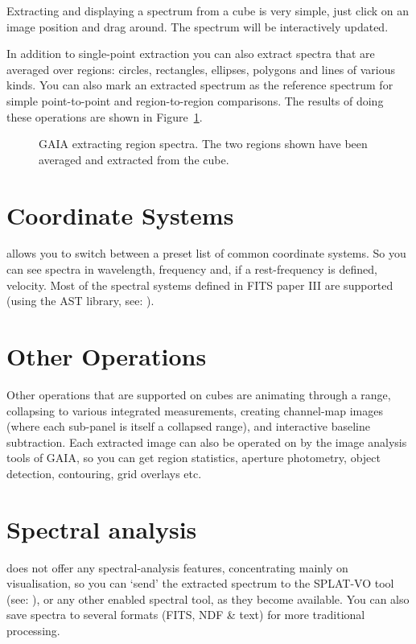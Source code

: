 \documentclass[11pt,twoside]{article}  %
\begin{document}
Extracting and displaying a spectrum from a cube is very simple, just click on
an image position and drag around. The spectrum will be interactively updated.

In addition to single-point extraction you can also extract spectra that are
averaged over regions: circles, rectangles, ellipses, polygons and lines of
various kinds. You can also mark an extracted spectrum as the reference
spectrum for simple point-to-point and region-to-region comparisons.
The results of doing these operations are shown in Figure~\ref{D1.1-fig2}.

\begin{figure}
\caption{GAIA extracting region spectra. The two regions shown have been
averaged and extracted from the cube.}
\label{D1.1-fig2}
\end{figure}


\section{Coordinate Systems}

allows you to switch between a preset list of common coordinate systems. So
you can see spectra in wavelength, frequency and, if a rest-frequency is
defined, velocity. Most of the spectral systems defined in FITS paper III are
supported (using the
AST library, see: ).

\section{Other Operations}

Other operations that are supported on cubes are animating through a range,
collapsing to various integrated measurements, creating channel-map images
(where each sub-panel is itself a collapsed range), and interactive baseline
subtraction. Each extracted image can also be operated on by the image
analysis tools of GAIA, so you can get region statistics, aperture photometry,
object detection, contouring, grid overlays etc.

\section{Spectral analysis}

does not offer any spectral-analysis features, concentrating mainly on
visualisation, so you can `send' the extracted spectrum to the SPLAT-VO tool
(see: ), or any other
enabled spectral tool, as they become available. You can also save spectra to
several formats (FITS, NDF \& text) for more traditional processing.
\end{document}
